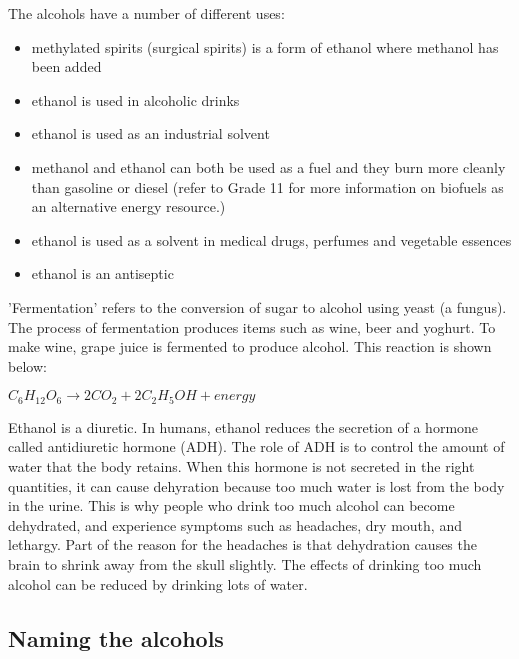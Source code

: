 The alcohols have a number of different uses:

\begin{itemize}
\item{methylated spirits (surgical spirits) is a form of ethanol where methanol has been added}
\item{ethanol is used in alcoholic drinks}
\item{ethanol is used as an industrial solvent}
\item{methanol and ethanol can both be used as a fuel and they burn more cleanly than gasoline or diesel (refer to Grade 11 for more information on biofuels as an alternative energy resource.)}
\item{ethanol is used as a solvent in medical drugs, perfumes and vegetable essences}
\item{ethanol is an antiseptic}
\end{itemize}

\begin{IFact}

'Fermentation' refers to the conversion of sugar to alcohol using yeast (a fungus). The process of fermentation produces items such as wine, beer and yoghurt. To make wine, grape juice is fermented to produce alcohol. This reaction is shown below:
\begin{center}
\rm${C_{6}H_{12}O_{6} \rightarrow 2CO_{2} + 2C_{2}H_{5}OH + energy}$
\end{center}
\end{IFact}

\begin{IFact}{
Ethanol is a diuretic. In humans, ethanol reduces the secretion of a hormone called antidiuretic hormone (ADH). The role of ADH is to control the amount of water that the body retains. When this hormone is not secreted in the right quantities, it can cause dehyration because too much water is lost from the body in the urine. This is why people who drink too much alcohol can become dehydrated, and experience symptoms such as headaches, dry mouth, and lethargy. Part of the reason for the headaches is that dehydration causes the brain to shrink away from the skull slightly. The effects of drinking too much alcohol can be reduced by drinking lots of water.}
\end{IFact}

\subsection{Naming the alcohols}
\label{subsec:om:alcoholnaming}

